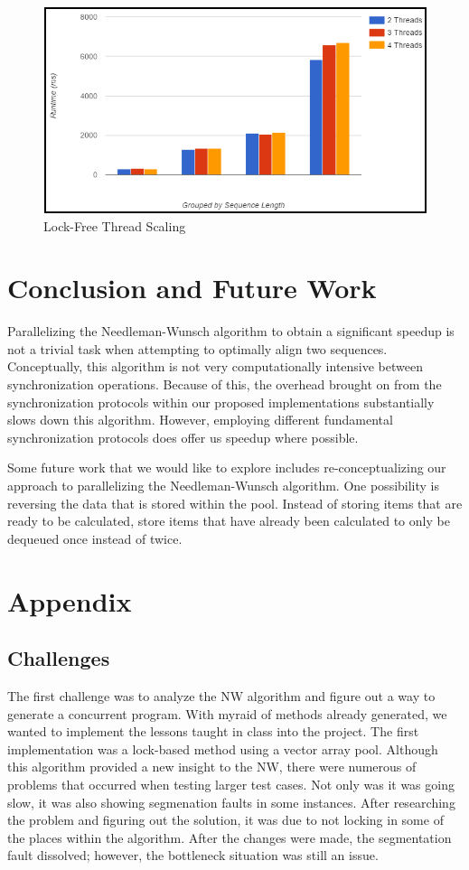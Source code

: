 \documentclass[letterpaper, 10 pt, conference]{IEEEconf}
\begin{document}
\begin{figure}
	\centering
	\includegraphics[scale=0.6]{parallel3-lockfree}
	\caption{Lock-Free Thread Scaling} 
\end{figure}


\section{Conclusion and Future Work}
Parallelizing the Needleman-Wunsch algorithm to obtain a significant speedup is not a trivial task when attempting to optimally align two sequences. Conceptually, this algorithm is not very computationally intensive between synchronization operations. Because of this, the overhead brought on from the synchronization protocols within our proposed implementations substantially slows down this algorithm. However, employing different fundamental synchronization protocols does offer us speedup where possible. 

Some future work that we would like to explore includes re-conceptualizing our approach to parallelizing the Needleman-Wunsch algorithm. One possibility is reversing the data that is stored within the pool. Instead of storing items that are ready to be calculated, store items that have already been calculated to only be dequeued once instead of twice. 



\section{Appendix}
\subsection{Challenges}
The first challenge was to analyze the NW algorithm and figure out a way to generate a concurrent program. With myraid of methods already generated, we wanted to implement the lessons taught in class into the project. The first implementation was a lock-based method using a vector array pool. Although this algorithm provided a new insight to the NW, there were numerous of problems that occurred when testing larger test cases. Not only was it was going slow, it was also showing segmenation faults in some instances. After researching the problem and figuring out the solution, it was due to not locking in some of the places within the algorithm. After the changes were made, the segmentation fault dissolved; however, the bottleneck situation was still an issue. 
\end{document}
